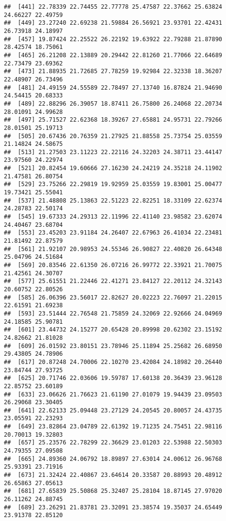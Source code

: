\documentclass[
]{article}
\begin{document}
\begin{verbatim}
##  [441] 22.78339 22.74455 22.77778 25.47587 22.37662 25.63824 24.66227 22.49759
##  [449] 23.27240 22.69238 21.59884 26.56921 23.93701 22.42431 26.73918 24.18997
##  [457] 19.87424 22.25522 26.22192 19.63922 22.79288 21.87890 28.42574 18.75061
##  [465] 26.21208 22.13889 20.29442 22.81260 21.77066 22.64689 22.73479 23.69362
##  [473] 21.88935 21.72685 27.78259 19.92984 22.32338 18.36207 22.48907 26.73496
##  [481] 24.49159 24.55589 22.78497 27.13740 16.87824 21.94690 24.54415 20.68333
##  [489] 22.88296 26.39057 18.87411 26.75800 26.24068 22.20734 28.01091 24.99628
##  [497] 25.71527 22.62368 18.39267 27.65881 24.95731 22.79266 28.01501 25.19713
##  [505] 20.67436 20.76359 21.27925 21.88558 25.73754 25.03559 21.14824 24.58675
##  [513] 21.27503 23.11223 22.22116 24.32203 24.38711 23.44147 23.97560 24.22974
##  [521] 20.82454 19.60666 27.16230 24.24219 24.35218 24.11902 21.47581 26.80754
##  [529] 23.75266 22.29819 19.92959 25.03559 19.83001 25.00477 19.73421 25.55041
##  [537] 21.48808 25.13863 22.51223 22.82251 18.33109 22.62374 24.28783 22.50174
##  [545] 19.67333 24.29313 22.11996 22.41140 23.98582 23.62074 24.40467 23.68704
##  [553] 23.45203 23.91184 24.26407 22.67963 26.41034 22.23481 21.81492 22.87579
##  [561] 21.92107 20.98953 24.55346 26.90827 22.40820 26.64348 25.04796 24.51684
##  [569] 20.83546 22.61350 26.07216 26.99772 22.33921 21.70075 21.42561 24.30707
##  [577] 25.61551 21.22446 22.41271 23.84127 22.20112 24.32143 20.60752 22.80526
##  [585] 26.06396 23.56017 22.82627 20.02223 22.76097 21.22015 22.61591 21.69238
##  [593] 23.51444 22.76548 21.75859 24.32069 22.92666 24.04969 24.18585 25.90781
##  [601] 23.44732 24.15277 20.65428 20.89998 20.62302 23.15192 24.82662 21.81028
##  [609] 26.01592 23.80151 23.78946 25.11894 25.25682 26.68950 29.43805 24.78906
##  [617] 20.87248 24.70006 22.10270 23.42084 24.18982 20.26440 23.84744 27.93725
##  [625] 20.71746 22.03606 19.59787 17.60138 20.36439 23.96128 22.85752 23.60189
##  [633] 23.06626 21.76623 21.61190 27.01079 19.94439 23.09503 26.29068 23.30405
##  [641] 22.62133 25.09448 23.27129 24.20545 20.80057 24.43735 23.05591 22.23293
##  [649] 23.82864 23.04789 22.61392 19.71235 24.75451 22.98116 20.70013 19.32803
##  [657] 25.23576 22.78299 22.36629 23.01203 22.53988 22.50303 24.79355 27.09508
##  [665] 24.89360 24.06792 18.89897 27.63014 24.00612 26.96768 25.93391 23.71916
##  [673] 21.32424 22.40867 23.64614 20.33587 20.88993 20.48912 26.65863 27.05613
##  [681] 27.65839 25.50868 25.32407 25.28104 18.87145 27.97020 26.11262 24.88745
##  [689] 23.26291 21.83781 23.32091 23.38574 19.35037 24.65449 23.91378 22.85120

\end{verbatim}
\end{document}
